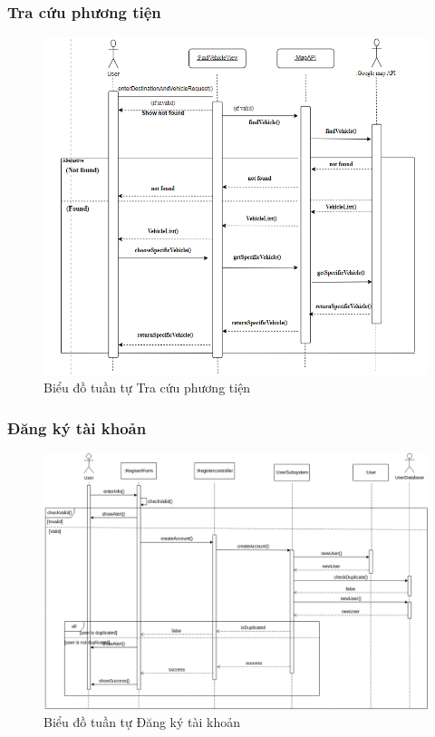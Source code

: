 \subsubsection{Tra cứu phương tiện}
\begin{figure}[H]
    \centering
    \includegraphics[width=\textwidth]{img3.4/3.4.1 timphuongtien.png} 
    \caption{Biểu đồ tuần tự Tra cứu phương tiện}
\end{figure}

\subsubsection{Đăng ký tài khoản}
\begin{figure}[H]
    \centering
    \includegraphics[width=\textwidth]{img3.4/Design_diagram-Đăng ký.drawio.png} 
    \caption{Biểu đồ tuần tự Đăng ký tài khoản}
\end{figure}

